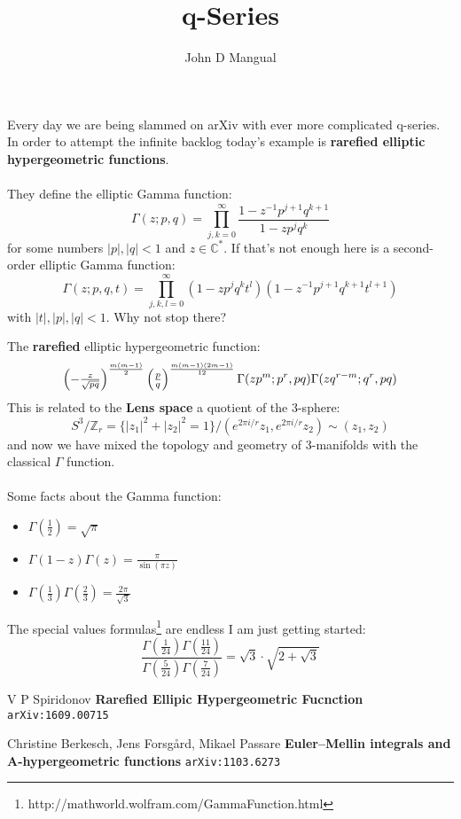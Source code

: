 \documentclass[12pt]{article}
\title{\textbf{ q-Series }}
\author{John D Mangual}
\date{}
\begin{document}
\selectfont \fontsize{24}{30}\selectfont

\maketitle

\noindent Every day we are being slammed on arXiv with ever more complicated q-series.  In order to attempt the infinite backlog today's example is \textbf{rarefied elliptic hypergeometric functions}.  \\ \\ 
They define the elliptic Gamma function:
$$ \Gamma(z; p, q) = \prod_{j,k=0}^\infty
\frac{1 - z^{-1} p^{j+1}q^{k+1}}{1 - z p^j q^k} $$
for some numbers $|p|, |q| < 1 $ and $z \in \mathbb{C}^\ast$.  If that's not enough here is a second-order elliptic Gamma function:
$$ \Gamma(z; p, q, t) = \prod_{j,k,l=0}^\infty
(1 - z p^j q^k t^l)(1 - z^{-1}p^{j+1}q^{k+1}t^{l+1}) $$ with $|t|, |p| , |q| < 1$.  \hfill Why not stop there?
\newpage

\noindent The \textbf{rarefied} elliptic hypergeometric function:
$$ \small \left( - \tfrac{z}{\sqrt{pq}} \right)^{\frac{m(m-1)}{2}}
\left(  \tfrac{p}{q} \right)^{\frac{m(m-1)(2m-1)}{12}}
\Gamma( zp^m ; p^r, pq)\Gamma(z q^{r-m}; q^r, pq) $$
This is related to the {\color{blue!50!white}\textbf{Lens space}} a quotient of the 3-sphere:
$$  S^3/\mathbb{Z}_r = \{ |z_1|^2 + |z_2|^2 = 1 \}/ (e^{2\pi i/r}z_1, e^{2\pi i / r}z_2) \sim (z_1, z_2)$$
and now we have mixed the topology and geometry of 3-manifolds with the classical $\Gamma$ function.  \\ \\ 
Some facts about the Gamma function:
\begin{itemize}
\item $\Gamma(\frac{1}{2}) = \sqrt{\pi}$
\item $\Gamma(1-z) \Gamma(z) = \frac{\pi}{\sin(\pi z)}$
\item $\Gamma(\frac{1}{3})\Gamma(\frac{2}{3}) = \frac{2\pi}{\sqrt{3}} $
\end{itemize} 
The special values formulas\footnote{http://mathworld.wolfram.com/GammaFunction.html} are endless I am just getting started:
$$ \frac{\Gamma(\frac{1}{24})\Gamma(\frac{11}{24})}{\Gamma(\frac{5}{24})\Gamma(\frac{7}{24})} = \sqrt{3}\cdot  \sqrt{2 + \sqrt{3}} $$

\selectfont \fontsize{12}{10}\selectfont

\begin{thebibliography}{}

\item V P Spiridonov  \textbf{Rarefied Ellipic Hypergeometric Fucnction} \texttt{arXiv:1609.00715}

\item Christine Berkesch, Jens Forsg\aa{}rd, Mikael Passare
\textbf{Euler--Mellin integrals and A-hypergeometric functions} \texttt{arXiv:1103.6273}

\end{thebibliography}
\end{document}
